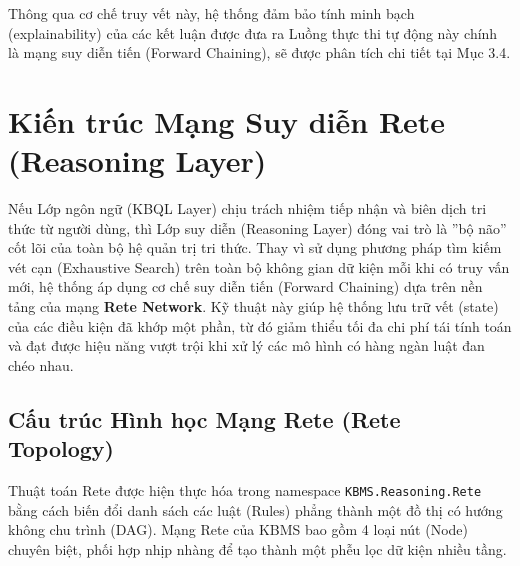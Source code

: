\documentclass[13pt,a4paper,oneside]{extreport}
\begin{document}
Thông qua cơ chế truy vết này, hệ thống đảm bảo tính minh bạch (explainability) của các kết luận được đưa ra Luồng thực thi tự động này chính là mạng suy diễn tiến (Forward Chaining), sẽ được phân tích chi tiết tại Mục 3.4.


\section{Kiến trúc Mạng Suy diễn Rete (Reasoning Layer)}


Nếu Lớp ngôn ngữ (KBQL Layer) chịu trách nhiệm tiếp nhận và biên dịch tri thức từ người dùng, thì Lớp suy diễn (Reasoning Layer) đóng vai trò là ''bộ não'' cốt lõi của toàn bộ hệ quản trị tri thức. Thay vì sử dụng phương pháp tìm kiếm vét cạn (Exhaustive Search) trên toàn bộ không gian dữ kiện mỗi khi có truy vấn mới, hệ thống áp dụng cơ chế suy diễn tiến (Forward Chaining) dựa trên nền tảng của mạng \textbf{Rete Network}. Kỹ thuật này giúp hệ thống lưu trữ vết (state) của các điều kiện đã khớp một phần, từ đó giảm thiểu tối đa chi phí tái tính toán và đạt được hiệu năng vượt trội khi xử lý các mô hình có hàng ngàn luật đan chéo nhau.


\subsection{Cấu trúc Hình học Mạng Rete (Rete Topology)}


Thuật toán Rete được hiện thực hóa trong namespace \texttt{KBMS.\allowbreak{}Reasoning.\allowbreak{}Rete} bằng cách biến đổi danh sách các luật (Rules) phẳng thành một đồ thị có hướng không chu trình (DAG). Mạng Rete của KBMS bao gồm 4 loại nút (Node) chuyên biệt, phối hợp nhịp nhàng để tạo thành một phễu lọc dữ kiện nhiều tầng.
\end{document}
